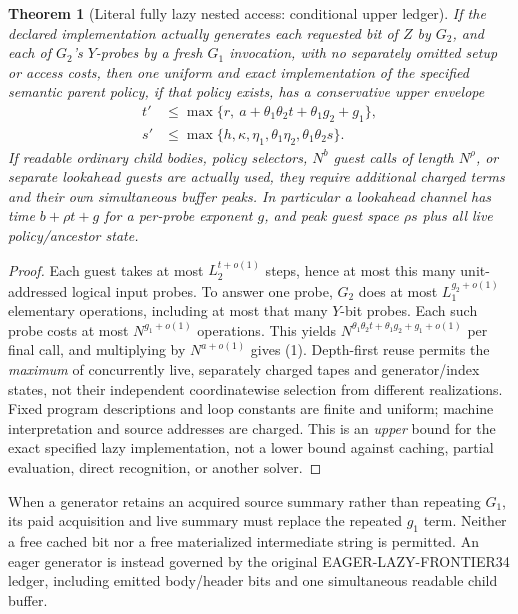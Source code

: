 \documentclass[11pt]{article}
\newtheorem{theorem}{Theorem}
\begin{document}
\begin{theorem}[Literal fully lazy nested access: conditional upper ledger]
If the declared implementation actually generates each requested bit of
\(Z\) by \(G_2\), and each of \(G_2\)'s \(Y\)-probes by a fresh \(G_1\)
invocation, with no separately omitted setup or access costs, then
one \emph{uniform and exact} implementation of the specified semantic parent
policy, if that policy exists, has a conservative upper envelope
\[
\boxed{\begin{split}
t'&\le\max\{r,\ a+\theta_1\theta_2 t
                     +\theta_1g_2+g_1\},\\
s'&\le\max\{h,\kappa,\eta_1,\theta_1\eta_2,
                      \theta_1\theta_2s\}.
\end{split}}
\tag{1}
\]
If readable ordinary child bodies, policy selectors, \(N^b\) guest
calls of length \(N^\rho\), or separate lookahead guests are actually
used, they require \emph{additional} charged terms and their own
simultaneous buffer peaks. In particular a lookahead channel has time
\(b+\rho t+g\) for a per-probe exponent \(g\), and peak guest
space \(\rho s\) plus all live policy/ancestor state.
\end{theorem}
\begin{proof}
Each guest takes at most \(L_2^{t+o(1)}\) steps, hence at most this many
unit-addressed logical input probes. To answer one probe, \(G_2\) does
at most \(L_1^{g_2+o(1)}\) elementary operations, including at most
that many \(Y\)-bit probes. Each such probe costs at most
\(N^{g_1+o(1)}\) operations. This yields
\(N^{\theta_1\theta_2t+\theta_1g_2+g_1+o(1)}\)
per final call, and multiplying by \(N^{a+o(1)}\) gives (1).
Depth-first reuse permits the \emph{maximum} of concurrently live,
separately charged tapes and generator/index states, not their independent
coordinatewise selection from different realizations. Fixed program
descriptions and loop constants are finite and uniform; machine
interpretation and source addresses are charged. This is an \emph{upper}
bound for the exact specified lazy implementation, not a lower bound
against caching, partial evaluation, direct recognition, or another solver.
\end{proof}
When a generator retains an acquired source summary rather than repeating
\(G_1\), its paid acquisition and live summary must replace the repeated
\(g_1\) term. Neither a free cached bit nor a free materialized intermediate
string is permitted. An eag\-er generator is instead governed by the
original EAGER-LAZY-FRONTIER34 ledger, including emitted body/header bits
and one simultaneous readable child buffer.
\end{document}

